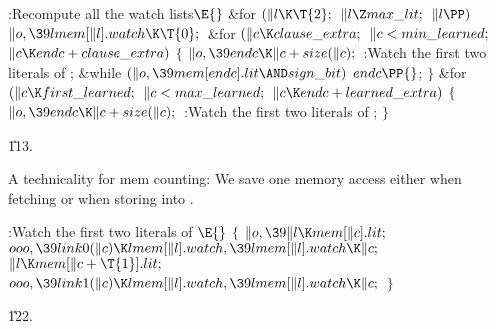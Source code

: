 \B{}:Recompute all the watch lists\X${}\E{}$\6
\&{for} ${}(\|l\K\T{2};{}$ ${}\|l\Z\\{max\_lit};{}$ ${}\|l\PP){}$\1\5
${}\|o,\39\\{lmem}[\|l].\\{watch}\K\T{0};{}$\2\6
\&{for} ${}(\|c\K\\{clause\_extra};{}$ ${}\|c<\\{min\_learned};{}$ ${}\|c\K%
\\{endc}+\\{clause\_extra}){}$\5
${}\{{}$\1\6
${}\|o,\39\\{endc}\K\|c+\\{size}(\|c);{}$\6
:Watch the first two literals of \X;\6
\&{while} ${}(\|o,\39\\{mem}[\\{endc}].\\{lit}\AND\\{sign\_bit}){}$\1\5
${}\\{endc}\PP{}$;\2\6
\4${}\}{}$\2\6
\&{for} ${}(\|c\K\\{first\_learned};{}$ ${}\|c<\\{max\_learned};{}$ ${}\|c\K%
\\{endc}+\\{learned\_extra}){}$\5
${}\{{}$\1\6
${}\|o,\39\\{endc}\K\|c+\\{size}(\|c);{}$\6
:Watch the first two literals of \X;\6
\4${}\}{}$\2\par
\U113.\fi

A technicality for mem counting: We save one memory access either when
fetching  or when storing into .

\Y\B\4:Watch the first two literals of \X${}\E{}$\6
${}\{{}$\1\6
${}\|o,\39\|l\K\\{mem}[\|c].\\{lit};{}$\6
${}\\{ooo},\39\\{link0}(\|c)\K\\{lmem}[\|l].\\{watch},\39\\{lmem}[\|l].%
\\{watch}\K\|c;{}$\6
${}\|l\K\\{mem}[\|c+\T{1}].\\{lit};{}$\6
${}\\{ooo},\39\\{link1}(\|c)\K\\{lmem}[\|l].\\{watch},\39\\{lmem}[\|l].%
\\{watch}\K\|c;{}$\6
\4${}\}{}$\2\par
\U122.\fi

